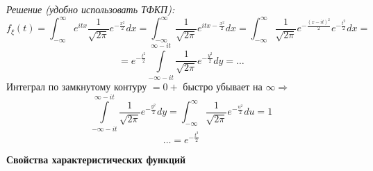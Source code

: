 \begin{exmp}
\begin{enumerate}
		\textit{Решение (удобно использовать ТФКП):}
		\[ f_{\xi} (t) = \int_{-\infty}^{\infty} e^{itx} \frac{1}{\sqrt{2 \pi}} e^{- \frac{x^2}{2}} dx = \int_{-\infty}^{\infty} \frac{1}{\sqrt{2 \pi}} e^{it x - \frac{x^2}{2}} dx = \int_{-\infty}^{\infty} \frac{1}{\sqrt{2 \pi}} e^{- \frac{(x - it)^2}{2}} e^{- \frac{t^2}{2}} dx = \]
		\[ = e^{- \frac{t^2}{2}} \int\limits_{-\infty - it}^{\infty - it} \frac{1}{\sqrt{2 \pi}} e^{- \frac{y^2}{2}} dy = \dots \]
		Интеграл по замкнутому контуру $= 0 +$ быстро убывает на $\infty \Rightarrow$
		\[ \int\limits_{-\infty - it}^{\infty - it} \frac{1}{\sqrt{2 \pi}} e^{- \frac{y^2}{2}} dy = \int_{-\infty}^{\infty} \frac{1}{\sqrt{2 \pi}} e^{-\frac{u^2}{2}} du = 1 \]
		\[  \dots = e^{- \frac{t^2}{2}} \]
		\begin{figure}[H]
		\end{figure}
	\end{enumerate}
\end{exmp}
\begin{center}
	\textbf{Свойства характеристических функций}
\end{center}
